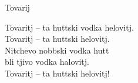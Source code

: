 \begin{song}{Tovarij}
	
	
	Tovaritj – ta huttski vodka helovitj.\\
	Tovaritj – ta huttski helovitj.\\
	Nitchevo nobbski vodka hutt\\
	bli tjivo vodka halovitj.\\
	Tovaritj – ta huttski helovitj!

\end{song}
